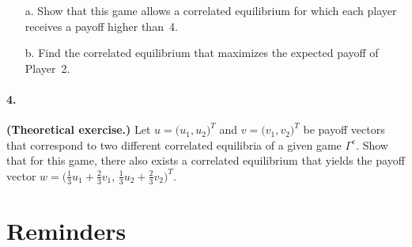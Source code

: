 \documentclass[a4paper,notitlepage,12pt]{article}
\begin{document}
\begin{enumerate}
	\item[a.] Show that this game allows a correlated equilibrium for which each player receives a payoff higher than~4.
	\item[b.] Find the correlated equilibrium that maximizes the expected payoff of Player~2.
\end{enumerate}

\paragraph{4. } \textbf{(Theoretical exercise.)} Let $u = \big( u_1, u_2 \big)^T$ and $v = \big( v_1, v_2 \big)^T$ be payoff vectors that correspond to two different correlated equilibria of a given game $\Gamma^c$. Show that for this game, there also exists a correlated equilibrium that yields the payoff vector $w = \big( \frac{1}{3} u_1 + \frac{2}{3} v_1, \, \frac{1}{3} u_2 + \frac{2}{3} v_2 \big)^T$. 

\newpage

\section*{Reminders}
\end{document}
